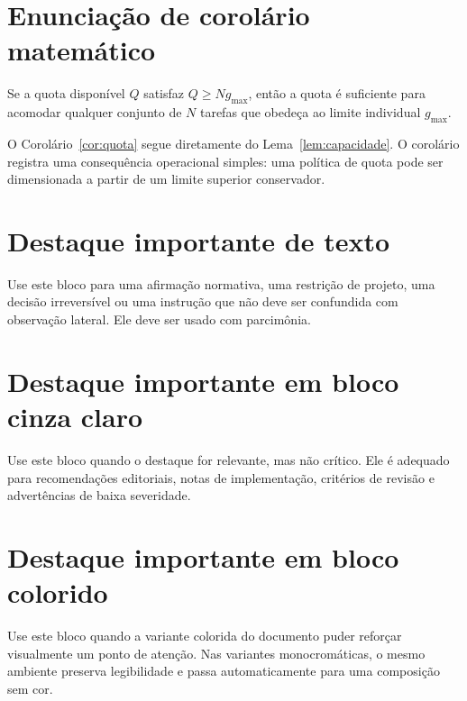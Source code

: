 \section{Enunciação de corolário matemático}

\begin{corollary}
\label{cor:quota}
Se a quota disponível $Q$ satisfaz $Q \geq N g_{\max}$, então a quota é suficiente para acomodar qualquer conjunto de $N$ tarefas que obedeça ao limite individual $g_{\max}$.
\end{corollary}

O Corolário~\ref{cor:quota} segue diretamente do Lema~\ref{lem:capacidade}. O corolário registra uma consequência operacional simples: uma política de quota pode ser dimensionada a partir de um limite superior conservador.

\section{Destaque importante de texto}

\begin{VSImportant}
Use este bloco para uma afirmação normativa, uma restrição de projeto, uma decisão irreversível ou uma instrução que não deve ser confundida com observação lateral. Ele deve ser usado com parcimônia.
\end{VSImportant}

\section{Destaque importante em bloco cinza claro}

\begin{VSImportantGray}
Use este bloco quando o destaque for relevante, mas não crítico. Ele é adequado para recomendações editoriais, notas de implementação, critérios de revisão e advertências de baixa severidade.
\end{VSImportantGray}

\section{Destaque importante em bloco colorido}

\begin{VSImportantColor}
Use este bloco quando a variante colorida do documento puder reforçar visualmente um ponto de atenção. Nas variantes monocromáticas, o mesmo ambiente preserva legibilidade e passa automaticamente para uma composição sem cor.
\end{VSImportantColor}
